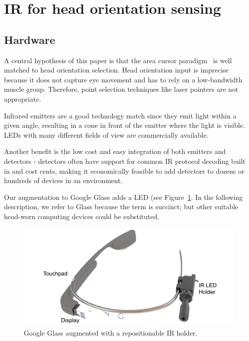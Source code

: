 \section{IR for head orientation sensing}
\subsection{Hardware}
A central hypothesis of this paper is that the area cursor paradigm~\cite{kabbash1995prince} is well matched to head orientation selection. Head orientation input is imprecise because it does not capture eye movement and has to rely on a low-bandwidth muscle group. Therefore, point selection techniques like laser pointers are not appropriate. 

Infrared emitters are a good technology match since they emit light within a given angle, resulting in a cone in front of the emitter where the light is visible. LEDs with many different fields of view are commercially available. 

Another benefit is the low cost and easy integration of both emitters and detectors - detectors often have support for common IR protocol decoding built in and cost cents, making it economically feasible to add detectors to dozens or hundreds of devices in an environment.

Our augmentation to Google Glass adds a  LED (see Figure~\ref{fig:glass}. In the following description, we refer to Glass because the term is succinct; but  other suitable head-worn computing devices could be substituted.


\begin{figure}[t]
\centering
\includegraphics[width=0.9\columnwidth]{figures/tube_from_top_annotated.pdf}
\caption{Google Glass augmented with a repositionable IR holder.}
\label{fig:glass}
\end{figure}

